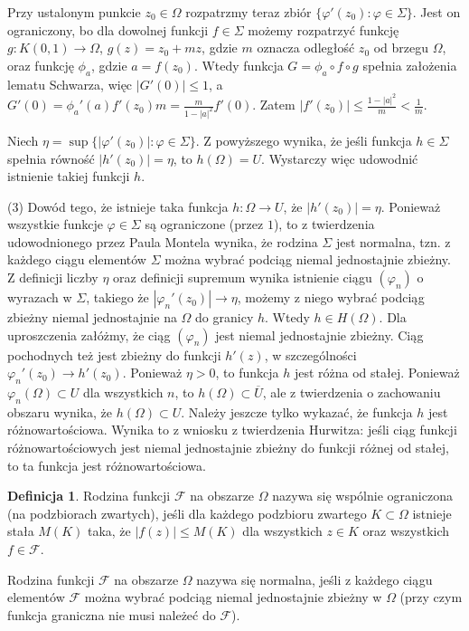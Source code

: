 \documentclass[11pt]{article}
\newcommand{\abs}[1]{\left|#1\right|} %
\newcommand{\closure}[1]{\overline{#1}} %
\theoremstyle{plain}
\theoremstyle{definition}
\newtheorem*{definition}{Definicja}
\theoremstyle{remark}
\let\oldendproof\endproof
\renewenvironment{proof}[1][\proofname]{
  \oldproof[\textsc{\small #1}]
}{\oldendproof}
\begin{document}
\begin{proof}
  Przy ustalonym punkcie $ z_0 \in \Omega $ rozpatrzmy teraz zbiór $ \{ \varphi'(z_0): \varphi \in \Sigma \} $.
  Jest on ograniczony, bo dla dowolnej funkcji $ f \in \Sigma $ możemy rozpatrzyć funkcję $ g: K(0, 1) \to \Omega $, $ g(z) = z_0 + mz $,
  gdzie $ m $ oznacza odległość $ z_0 $ od brzegu $ \Omega $,
  oraz funkcję $ \phi_{a} $, gdzie $ a = f(z_0) $.
  Wtedy funkcja $ G = \phi_a \circ f \circ g $ spełnia założenia lematu Schwarza, więc $ \abs{G'(0)} \leq 1 $, a $ G'(0) = \phi_a'(a)f'(z_0)m = \frac{m}{1 - \abs{a}^2}f'(0)$.
  Zatem $ \abs{f'(z_0)} \leq \frac{1-\abs{a}^2}{m} < \frac{1}{m} $.

  Niech $ \eta = \sup\{ \abs{\varphi'(z_0)} : \varphi \in \Sigma \}$.
  Z powyższego wynika, że jeśli funkcja $ h \in \Sigma $ spełnia równość $ \abs{h'(z_0)} = \eta $, to $ h(\Omega) = U$.
  Wystarczy więc udowodnić istnienie takiej funkcji $h$.

  (3) Dowód tego, że istnieje taka funkcja $ h:\Omega \to U $, że $ \abs{h'(z_0)} = \eta $.
  Ponieważ wszystkie funkcje $ \varphi \in \Sigma $ są ograniczone (przez $1$),
  to z twierdzenia udowodnionego przez Paula Montela wynika, że rodzina $\Sigma$ jest normalna,
  tzn. z każdego ciągu elementów $\Sigma$ można wybrać podciąg niemal jednostajnie zbieżny.
  Z definicji liczby $\eta$ oraz definicji supremum wynika istnienie ciągu $ (\varphi_n) $ o wyrazach w $\Sigma$, takiego że $ \abs{\varphi_n'(z_0)} \to \eta $,
  możemy z niego wybrać podciąg zbieżny niemal jednostajnie na $ \Omega $ do granicy $h$.
  Wtedy $ h \in H(\Omega) $.
  Dla uproszczenia załóżmy, że ciąg $ (\varphi_n) $ jest niemal jednostajnie zbieżny.
  Ciąg pochodnych też jest zbieżny do funkcji $ h'(z) $, w szczególności $ \varphi_n'(z_0) \to h'(z_0) $.
  Ponieważ $ \eta > 0 $, to funkcja $h$ jest różna od stałej.
  Ponieważ $ \varphi_n(\Omega) \subset U $ dla wszystkich $n$, to $ h(\Omega) \subset \closure{U} $, ale z twierdzenia o zachowaniu obszaru wynika, że $ h(\Omega) \subset U $.
  Należy jeszcze tylko wykazać, że funkcja $h$ jest różnowartościowa.
  Wynika to z wniosku z twierdzenia Hurwitza:
  jeśli ciąg funkcji różnowartościowych jest niemal jednostajnie zbieżny do funkcji różnej od stałej, to ta funkcja jest różnowartościowa.
\end{proof}

\begin{definition}
  Rodzina funkcji $ \mathcal{F} $ na obszarze $ \Omega $ nazywa się wspólnie ograniczona (na podzbiorach zwartych),
  jeśli dla każdego podzbioru zwartego $ K \subset \Omega $ istnieje stała $ M(K) $ taka, że $ \abs{f(z)} \leq M(K) $ dla wszystkich $ z \in K $ oraz wszystkich $ f \in \mathcal{F} $.
  
  Rodzina funkcji $ \mathcal{F} $ na obszarze $ \Omega $ nazywa się normalna, jeśli z każdego ciągu elementów $ \mathcal{F} $ można wybrać podciąg niemal jednostajnie zbieżny w $ \Omega $ (przy czym funkcja graniczna nie musi należeć do $ \mathcal{F} $).
\end{definition}
\end{document}
